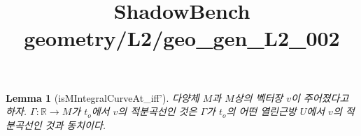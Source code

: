 \documentclass{article}
\title{ShadowBench geometry/L2/geo\_gen\_L2\_002}
\newtheorem{lemma}{Lemma}
\begin{document}
\maketitle

\begin{lemma}[isMIntegralCurveAt_iff']
다양체 $M$과 $M$상의 벡터장 $v$이 주어졌다고 하자.  $\Gamma : ℝ → M$가 $t_o$에서 $v$의 적분곡선인 것은 $\Gamma$가  $t_o$의 어떤 열린근방 $U$에서 $v$의 적분곡선인 것과 동치이다. 
\end{lemma}
\end{document}
